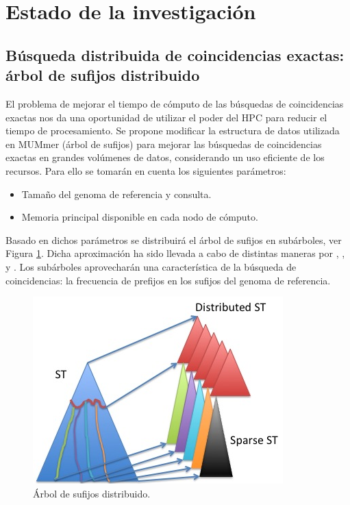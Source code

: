 \documentclass[12pt,a4paper]{article}
\begin{document}
\section{Estado de la investigación}
\subsection{Búsqueda distribuida de coincidencias exactas: árbol de sufijos distribuido}
El problema de mejorar el tiempo de cómputo de las búsquedas de coincidencias 
exactas nos da una oportunidad de utilizar el poder del HPC para reducir el
tiempo de procesamiento. Se propone modificar la estructura de datos utilizada en 
MUMmer (árbol de sufijos) para mejorar las búsquedas de coincidencias exactas en 
grandes volúmenes de datos, considerando un uso eficiente de los recursos. Para 
ello se tomarán en cuenta los siguientes parámetros: 
\begin{itemize}
\item Tamaño del genoma de referencia y consulta.
\item Memoria principal disponible en cada nodo de cómputo.
\end{itemize}
Basado en dichos parámetros se distribuirá el árbol de sufijos en subárboles, 
ver Figura \ref{fig:estructura}. Dicha aproximación ha sido llevada a cabo de distintas maneras por \cite{Mansour2012}, 
\cite{Japp2004}, \cite{Ghoting2010} y \cite{Sadakane}.
 Los subárboles aprovecharán una característica
de la búsqueda de coincidencias: la frecuencia de prefijos en los sufijos del genoma de referencia.\\ 
\begin{figure}[h]
\begin{center}
\includegraphics[scale=0.8]{distributed.png}
\caption{Árbol de sufijos distribuido.}
\label{fig:estructura}
\end{center}
\end{figure}
\end{document}
